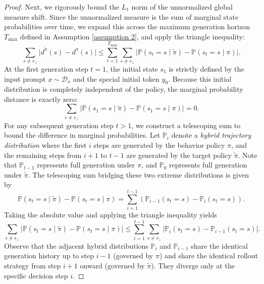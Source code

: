 \documentclass{article}
\theoremstyle{plain}
\theoremstyle{definition}
\theoremstyle{remark}
\begin{document}
\begin{proof}
	Next, we rigorously bound the $L_1$ norm of the unnormalized global measure shift. Since the unnormalized measure is the sum of marginal state probabilities over time, we expand this across the maximum generation horizon $T_{\max}$ defined in Assumption \ref{assumption 2}, and apply the triangle inequality:
	\begin{equation}
		\sum_{s \neq s_\bot} \lvert d^{\tilde{\pi}}(s) - d^\pi(s) \rvert \leq \sum_{t=1}^{T_{\max}} \sum_{s \neq s_\bot} \lvert \mathbb{P}(s_t = s \mid \tilde{\pi}) - \mathbb{P}(s_t = s \mid \pi) \rvert.
	\end{equation}
	At the first generation step $t=1$, the initial state $s_1$ is strictly defined by the input prompt $x \sim \mathcal{D}_x$ and the special initial token $y_0$. Because this initial distribution is completely independent of the policy, the marginal probability distance is exactly zero:
	\begin{equation}
		\sum_{s \neq s_\bot} \lvert \mathbb{P}(s_1 = s \mid \tilde{\pi}) - \mathbb{P}(s_1 = s \mid \pi) \rvert = 0.
	\end{equation}
	For any subsequent generation step $t > 1$, we construct a telescoping sum to bound the difference in marginal probabilities. Let $\mathbb{P}_i$ denote a \textit{hybrid trajectory distribution} where the first $i$ steps are generated by the behavior policy $\pi$, and the remaining steps from $i+1$ to $t-1$ are generated by the target policy $\tilde{\pi}$. Note that $\mathbb{P}_{t-1}$ represents full generation under $\pi$, and $\mathbb{P}_0$ represents full generation under $\tilde{\pi}$. The telescoping sum bridging these two extreme distributions is given by
	\begin{equation}
		\mathbb{P}(s_t = s \mid \tilde{\pi}) - \mathbb{P}(s_t = s \mid \pi)=\sum_{i=1}^{t-1}\left(\mathbb{P}_{i-1}(s_t = s)-\mathbb{P}_i(s_t = s)\right).
	\end{equation}
	Taking the absolute value and applying the triangle inequality yields
	\begin{equation}
		\sum_{s \neq s_\bot}\lvert\mathbb{P}(s_t = s \mid \tilde{\pi}) - \mathbb{P}(s_t = s \mid \pi)\rvert\leq\sum_{i=1}^{t-1}\sum_{s \neq s_\bot}\lvert\mathbb{P}_i(s_t = s)-\mathbb{P}_{i-1}(s_t = s)\rvert.
	\end{equation}
	Observe that the adjacent hybrid distributions $\mathbb{P}_i$ and $\mathbb{P}_{i-1}$ share the identical generation history up to step $i-1$ (governed by $\pi$) and share the identical rollout strategy from step $i+1$ onward (governed by $\tilde{\pi}$). They diverge only at the specific decision step $i$.
	

\end{proof}
\end{document}
